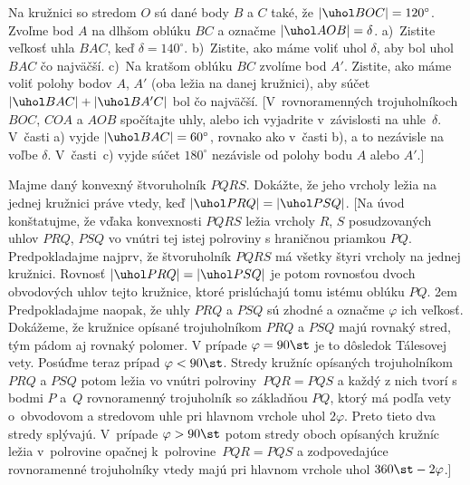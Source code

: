 {
Na kružnici so stredom $O$ sú dané body $B$ a $C$ také, že
$|\uhol BOC|=120^\circ$. Zvoľme bod $A$ na
dlhšom oblúku $BC$ a označme $|\uhol AOB|=\delta$. a)~Zistite veľkosť uhla $BAC$, keď
$\delta=140^\circ$. b)~Zistite, ako máme voliť uhol $\delta$, aby bol uhol $BAC$ čo najväčší. c)~Na kratšom oblúku $BC$ zvolíme bod $A'$.
Zistite, ako máme voliť polohy bodov $A$, $A'$
(oba ležia na danej kružnici), aby súčet $|\uhol BAC|+|\uhol BA'C|$
bol čo najväčší.
[V~rovnoramenných trojuholníkoch $BOC$, $COA$ a $AOB$ spočítajte
uhly, alebo ich vyjadrite v~závislosti na uhle~$\delta$. V~časti a)
vyjde $|\uhol BAC|=60^\circ$, rovnako ako v~časti b), a to nezávisle na
voľbe $\delta$.
V~časti~c) vyjde súčet $180^\circ$ nezávisle od
polohy bodu $A$ alebo $A'$.]

Majme daný konvexný štvoruholník $PQRS$. Dokážte, že jeho vrcholy
ležia na jednej kružnici práve vtedy, keď $|\uhol PRQ|=|\uhol PSQ|$.
[Na úvod konštatujme, že vďaka konvexnosti $PQRS$ ležia
vrcholy $R$, $S$ posudzovaných uhlov $PRQ$, $PSQ$ vo vnútri
tej istej polroviny s hraničnou priamkou $PQ$.
Predpokladajme najprv, že štvoruholník $PQRS$ má všetky štyri
vrcholy na jednej kružnici. Rovnosť $|\uhol PRQ|=|\uhol PSQ|$
je potom rovnosťou dvoch obvodových uhlov tejto kružnice, ktoré
prislúchajú tomu istému oblúku $PQ$.
  \hfill\break\hglue2em
Predpokladajme naopak, že uhly $PRQ$ a $PSQ$ sú zhodné a
označme $\varphi$ ich veľkosť. Dokážeme, že kružnice opísané
trojuholníkom $PRQ$ a $PSQ$ majú rovnaký stred, tým pádom aj rovnaký polomer.
V prípade $\varphi=90\st$ je to dôsledok Tálesovej vety. Posúďme
teraz prípad $\varphi<90\st$. Stredy kružníc opísaných
trojuholníkom~$PRQ$ a $PSQ$ potom ležia vo vnútri polroviny~$PQR=PQS$ a
každý z nich tvorí s bodmi $P$ a~$Q$ rovnoramenný trojuholník
so základňou $PQ$, ktorý má podľa vety o~obvodovom a stredovom uhle
pri hlavnom vrchole uhol $2\varphi$. Preto tieto dva stredy
splývajú. V~prípade $\varphi>90\st$ potom stredy oboch opísaných kružníc
ležia v~polrovine opačnej k~polrovine~$PQR=PQS$ a
zodpovedajúce rovnoramenné trojuholníky vtedy majú pri hlavnom vrchole uhol
$360\st-2\varphi$.]

}
